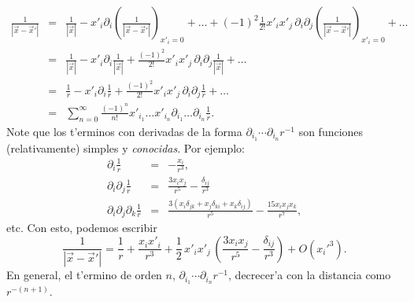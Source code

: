 \begin{eqnarray}
\frac{1}{\left|\vec{x}-\vec{x}'\right|}
&=&\frac{1}{\left|\vec{x}\right|}
-x'_i\partial_i\left(\frac{1}{\left|\vec{x}-\vec{x}'\right|} \right)
_{x'_i=0}+\dots+(-1)^2\frac{1}{2!}x'_ix'_j\,
\partial_i\partial_j\left(\frac{1} { \left|\vec{x}-\vec{x}
'\right|} \right) _{x'_i=0}+\dots \\
&=&\frac{1}{\left|\vec{x}\right|}-x'_i\partial_i\frac{1}{\left|\vec{x}\right|}
 +\frac{(-1)^2}{2!}x'_ix'_j\,\partial_i\partial_j\frac{1}{\left|\vec{x}\right|}
+\dots \\
&=&\frac{1}{r}-x'_i\partial_i\frac{1}{r}+\frac{(-1)^2}{2!}x'_ix'_j\,
\partial_i\partial_j\frac{1}{r} +\dots \\
&=&\sum_{n=0}^\infty\frac{(-1)^n}{n!}x'_{i_1}\dots x'_{i_n}\partial_{i_1}\dots
\partial_{i_n}\frac{1}{r} .\label{exp1or}
\end{eqnarray}
Note que los t'erminos con derivadas de la forma $\partial_{i_1}\cdots
\partial_{i_n}r^{-1}$ son funciones (relativamente) simples y \textit{conocidas}.
Por ejemplo:
\begin{eqnarray}
\partial_i\frac{1}{r}&=&-\frac{x_i}{r^3}, \\
\partial_i\partial_j\frac{1}{r}
&=& \frac{3x_ix_j}{r^5}-\frac{\delta_{ij}}{r^3} \\
\partial_i\partial_j\partial_k\frac{1}{r}
&=& \frac{3\left(x_i\delta_{jk}+x_j\delta_{ki}+x_k\delta_{ij}\right)}{r^5}
-\frac{15x_ix_jx_k}{r^7},
\end{eqnarray}
etc. Con esto, podemos escribir
\begin{equation} \label{eq3.2.3}
\frac{1}{|\vec{x}-\vec{x}'|}=\frac{1}{r}+\frac{x_ix'_i}{r^3}
+\frac{1}{2}\,x'_ix'_j\,\left(\frac{3x_ix_j}{r^5}-\frac{\delta_{ij}}{
r^3}\right)+O\left(x_i'^3\right).
\end{equation}
En general, el t'ermino de orden $n$, $\partial_{i_1}\cdots
\partial_{i_n}r^{-1}$, decrecer'a con la distancia como $r^{-(n+1)}$.

